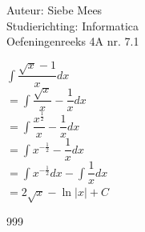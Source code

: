 \documentclass[a4paper]{article}
\begin{document}
  
\noindent \large Auteur: Siebe Mees \\
\noindent \large Studierichting: Informatica\\
\noindent \large Oefeningenreeks 4A nr. 7.1\\

\medskip

\normalsize

$\displaystyle\int \dfrac{\sqrt{x}-1}{x} dx$\\

$ = \displaystyle\int \dfrac{\sqrt{x}}{x} - \dfrac{1}{x} dx$\\

$ = \displaystyle\int \dfrac{x^{\tfrac{1}{2}}}{x} - \dfrac{1}{x} dx$\\

$ = \displaystyle\int  x^{-\tfrac{1}{2}} - \dfrac{1}{x} dx$\\

$ = \displaystyle\int  x^{-\tfrac{1}{2}} dx - \displaystyle\int \dfrac{1}{x} dx$\\

$ = 2\sqrt{x} - \ln|x| + C $\\

\begin{thebibliography}{999}
\end{thebibliography}
\end{document}
